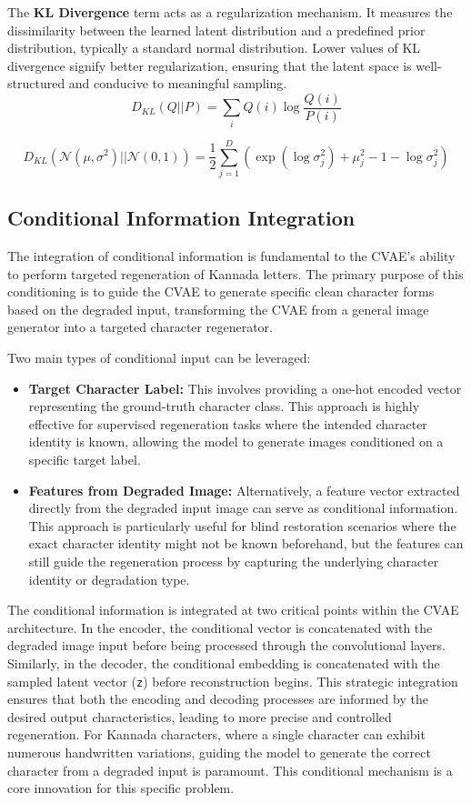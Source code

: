 \documentclass[conference]{IEEEtran}
\begin{document}
The \textbf{KL Divergence} term acts as a regularization mechanism. It measures the dissimilarity between the learned latent distribution and a predefined prior distribution, typically a standard normal distribution. Lower values of KL divergence signify better regularization, ensuring that the latent space is well-structured and conducive to meaningful sampling.\cite{Kumar2020}
$$D_{KL}(Q||P) = \sum_{i} Q(i) \log \frac{Q(i)}{P(i)}$$

$$D_{KL}(\mathcal{N}(\mu, \sigma^2) || \mathcal{N}(0, 1)) = \frac{1}{2} \sum_{j=1}^{D} (\exp(\log\sigma^2_j) + \mu_j^2 - 1 - \log\sigma^2_j)$$


\subsection{Conditional Information Integration}
\justify
The integration of conditional information is fundamental to the CVAE's ability to perform targeted regeneration of Kannada letters. The primary purpose of this conditioning is to guide the CVAE to generate specific clean character forms based on the degraded input, transforming the CVAE from a general image generator into a targeted character regenerator.\cite{Kumar2020, Graves2013}

Two main types of conditional input can be leveraged:
\begin{itemize}[noitemsep,topsep=0pt,parsep=0pt,partopsep=0pt]
    \item \textbf{Target Character Label:} This involves providing a one-hot encoded vector representing the ground-truth character class. This approach is highly effective for supervised regeneration tasks where the intended character identity is known, allowing the model to generate images conditioned on a specific target label.\cite{Kumar2020, Graves2013}
    \item \textbf{Features from Degraded Image:} Alternatively, a feature vector extracted directly from the degraded input image can serve as conditional information. This approach is particularly useful for blind restoration scenarios where the exact character identity might not be known beforehand, but the features can still guide the regeneration process by capturing the underlying character identity or degradation type.
\end{itemize}

The conditional information is integrated at two critical points within the CVAE architecture. In the encoder, the conditional vector is concatenated with the degraded image input before being processed through the convolutional layers. Similarly, in the decoder, the conditional embedding is concatenated with the sampled latent vector (\texttt{z}) before reconstruction begins.\cite{Kumar2020, Graves2013} This strategic integration ensures that both the encoding and decoding processes are informed by the desired output characteristics, leading to more precise and controlled regeneration. For Kannada characters, where a single character can exhibit numerous handwritten variations, guiding the model to generate the correct character from a degraded input is paramount. This conditional mechanism is a core innovation for this specific problem.
\end{document}
